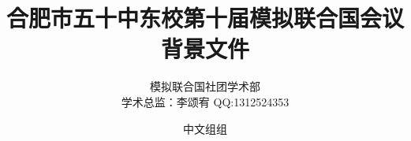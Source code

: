 \documentclass{article}
\title{合肥市五十中东校第十届模拟联合国会议\\\huge 背景文件}
\author{模拟联合国社团学术部 \\ 学术总监：李颂宥 QQ:1312524353 \and 中文组组}
\begin{document}
    \centering
    \maketitle
    \clearpage
    \tableofcontents
\end{document}
